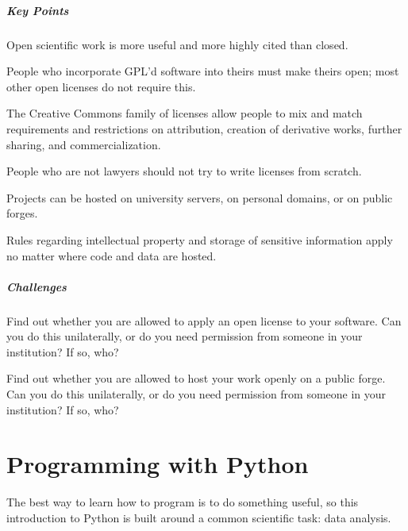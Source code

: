 \documentclass{book}
\begin{document}
\mbox{}\paragraph{Key Points}

\begin{swcitemize}
\item
  Open scientific work is more useful and more highly cited than closed.
\item
  People who incorporate GPL'd software into theirs must make theirs
  open; most other open licenses do not require this.
\item
  The Creative Commons family of licenses allow people to mix and match
  requirements and restrictions on attribution, creation of derivative
  works, further sharing, and commercialization.
\item
  People who are not lawyers should not try to write licenses from
  scratch.
\item
  Projects can be hosted on university servers, on personal domains, or
  on public forges.
\item
  Rules regarding intellectual property and storage of sensitive
  information apply no matter where code and data are hosted.
\end{swcitemize}

\mbox{}\paragraph{Challenges}

\begin{swcenumerate}
\item
  Find out whether you are allowed to apply an open license to your
  software. Can you do this unilaterally, or do you need permission from
  someone in your institution? If so, who?
\item
  Find out whether you are allowed to host your work openly on a public
  forge. Can you do this unilaterally, or do you need permission from
  someone in your institution? If so, who?
\end{swcenumerate}

\chapter{Programming with Python}\label{s:python}

The best way to learn how to program is to do something useful, so this
introduction to Python is built around a common scientific task: data
analysis.
\end{document}
